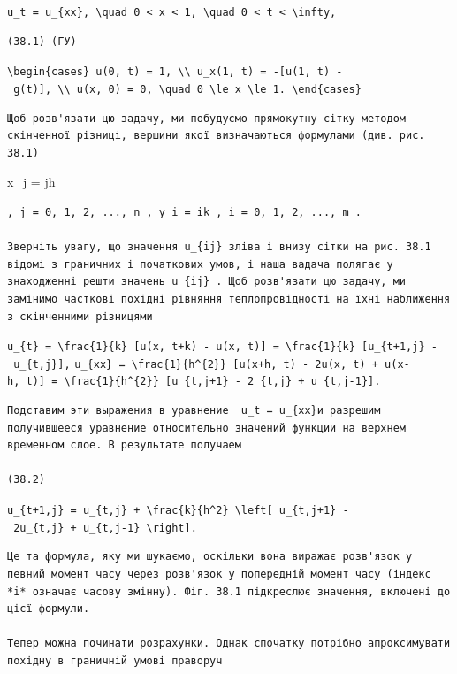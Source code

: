 \documentclass[
  ukrainian,
]{article}
\begin{document}
\texttt{u\_t\ =\ u\_\{xx\},\ \textbackslash{}quad\ 0\ \textless{}\ x\ \textless{}\ 1,\ \textbackslash{}quad\ 0\ \textless{}\ t\ \textless{}\ \textbackslash{}infty,}

\begin{verbatim}
(38.1) (ГУ)
\end{verbatim}

\texttt{\textbackslash{}begin\{cases\}\ u(0,\ t)\ =\ 1,\ \textbackslash{}\textbackslash{}\ u\_x(1,\ t)\ =\ -{[}u(1,\ t)\ -\ g(t){]},\ \textbackslash{}\textbackslash{}\ u(x,\ 0)\ =\ 0,\ \textbackslash{}quad\ 0\ \textbackslash{}le\ x\ \textbackslash{}le\ 1.\ \textbackslash{}end\{cases\}}

\begin{verbatim}
Щоб розв'язати цю задачу, ми побудуємо прямокутну сітку методом скінченної різниці, вершини якої визначаються формулами (див. рис. 38.1)
\end{verbatim}

x\_j = jh

\begin{verbatim}
, j = 0, 1, 2, ..., n , y_i = ik , i = 0, 1, 2, ..., m .

Зверніть увагу, що значення u_{ij} зліва і внизу сітки на рис. 38.1 відомі з граничних і початкових умов, і наша вадача полягає у знаходженні решти значень u_{ij} . Щоб розв'язати цю задачу, ми замінимо часткові похідні рівняння теплопровідності на їхні наближення з скінченними різницями
\end{verbatim}

\texttt{u\_\{t\}\ =\ \textbackslash{}frac\{1\}\{k\}\ {[}u(x,\ t+k)\ -\ u(x,\ t){]}\ =\ \textbackslash{}frac\{1\}\{k\}\ {[}u\_\{t+1,j\}\ -\ u\_\{t,j\}{]},}
\texttt{u\_\{xx\}\ =\ \textbackslash{}frac\{1\}\{h\^{}\{2\}\}\ {[}u(x+h,\ t)\ -\ 2u(x,\ t)\ +\ u(x-h,\ t){]}\ =\ \textbackslash{}frac\{1\}\{h\^{}\{2\}\}\ {[}u\_\{t,j+1\}\ -\ 2\_\{t,j\}\ +\ u\_\{t,j-1\}{]}.}

\begin{verbatim}
Подставим эти выражения в уравнение  u_t = u_{xx}и разрешим получившееся уравнение относительно значений функции на верхнем временном слое. В результате получаем

(38.2)
\end{verbatim}

\texttt{u\_\{t+1,j\}\ =\ u\_\{t,j\}\ +\ \textbackslash{}frac\{k\}\{h\^{}2\}\ \textbackslash{}left{[}\ u\_\{t,j+1\}\ -\ 2u\_\{t,j\}\ +\ u\_\{t,j-1\}\ \textbackslash{}right{]}.}

\begin{verbatim}
Це та формула, яку ми шукаємо, оскільки вона виражає розв'язок у певний момент часу через розв'язок у попередній момент часу (індекс *i* означає часову змінну). Фіг. 38.1 підкреслює значення, включені до цієї формули.

Тепер можна починати розрахунки. Однак спочатку потрібно апроксимувати похідну в граничній умові праворуч
\end{verbatim}
\end{document}
